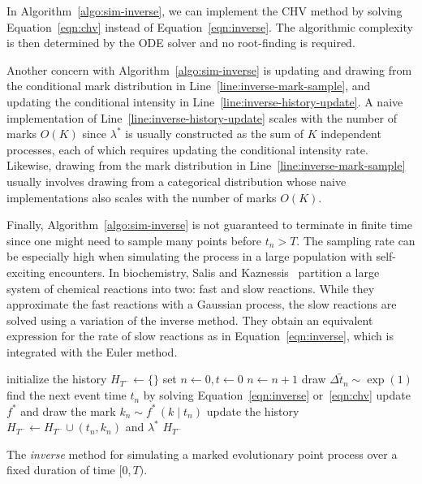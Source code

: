 \documentclass{juliacon}
\begin{document}
In Algorithm~\ref{algo:sim-inverse}, we can implement the CHV method by solving Equation~\ref{eqn:chv} instead of Equation~\ref{eqn:inverse}. The algorithmic complexity is then determined by the ODE solver and no root-finding is required.

Another concern with Algorithm~\ref{algo:sim-inverse} is updating and drawing from the conditional mark distribution in Line~\ref{line:inverse-mark-sample}, and updating the conditional intensity in Line~\ref{line:inverse-history-update}. A naive implementation of Line~\ref{line:inverse-history-update} scales with the number of marks \( O(K) \) since \( \lambda^\ast \) is usually constructed as the sum of \( K \) independent processes, each of which requires updating the conditional intensity rate. Likewise, drawing from the mark distribution in Line~\ref{line:inverse-mark-sample} usually involves drawing from a categorical distribution whose naive implementations also scales with the number of marks \( O(K) \).

Finally, Algorithm~\ref{algo:sim-inverse} is not guaranteed to terminate in finite time since one might need to sample many points before \( t_n > T \). The sampling rate can be especially high when simulating the process in a large population with self-exciting encounters. In biochemistry, Salis and Kaznessis~\cite{salis2005} partition a large system of chemical reactions into two: fast and slow reactions. While they approximate the fast reactions with a Gaussian process, the slow reactions are solved using a variation of the inverse method. They obtain an equivalent expression for the rate of slow reactions as in Equation~\ref{eqn:inverse}, which is integrated with the Euler method.

\begin{algorithm}[h]
\begin{algorithmic}[1]
  \Procedure{InverseMethod}{\( [0, T) \), \( \lambda^\ast \), \( f^\ast \),}
    \State initialize the history \( H_{T^-} \leftarrow \{ \} \)
    \State set \( n \leftarrow 0, t \leftarrow  0 \)
      \State \( n \leftarrow n + 1 \)
      \State draw \( \Delta \tilde{t}_n \sim \exp(1) \)
      \State find the next event time \( t_n \) by solving Equation~\ref{eqn:inverse} or~\ref{eqn:chv}
      \State update \( f^\ast \) and draw the mark \( k_n \sim f^\ast \, (k \mid t_n) \) \label{line:inverse-mark-sample}
      \State update the history \( H_{T^-} \leftarrow H_{T^-} \cup (t_n, k_n) \) and \( \lambda^\ast \) \label{line:inverse-history-update}
    \EndWhile
    \State \Return \( H_{T^-} \)
  \EndProcedure
\end{algorithmic}
\caption{The \textit{inverse} method for simulating a marked evolutionary point process over a fixed duration of time \( [0, T) \).}
\label{algo:sim-inverse}
\end{algorithm}
\end{document}
